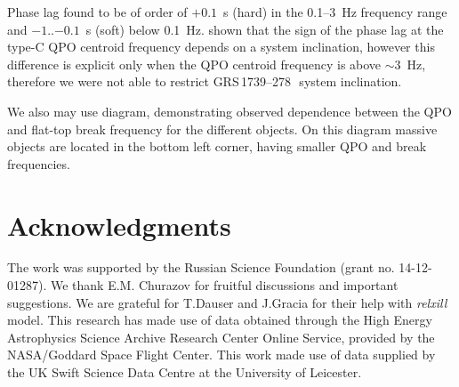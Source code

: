 \documentclass[a4paper,fleqn,usenatbib]{mnras}
\def\grs{{GRS\,1739--278\,}}
\begin{document}
Phase lag found to be of order of $+0.1$~s (hard) in the 0.1--3~Hz frequency range and $-1$..$-0.1$~s (soft) below 0.1~Hz.
\citet{2017MNRAS.464.2643V} shown that the sign of the phase lag at the type-C QPO centroid frequency depends on a system inclination, however this difference is explicit only when the QPO centroid frequency is above $\sim3$~Hz, therefore we were not able to restrict \grs\ system inclination.

We also may use \citep{1999ApJ...514..939W} diagram, demonstrating observed dependence between the QPO and flat-top break frequency for the different objects. 
On this diagram massive objects are located in the bottom left corner, having smaller QPO and break frequencies.


\section*{Acknowledgments}
The work was supported by the Russian Science Foundation (grant no. 14-12-01287). 
We thank E.M. Churazov for fruitful discussions and important suggestions. 
We are grateful for T.Dauser and J.Gracia for their help with {\em relxill} model. 
This research has made use of data obtained through the High Energy Astrophysics Science Archive Research Center Online Service, provided by the NASA/Goddard Space Flight Center.
This work made use of data supplied by the UK Swift Science Data Centre at the University of Leicester.



\bsp	
\label{lastpage}
\end{document}
